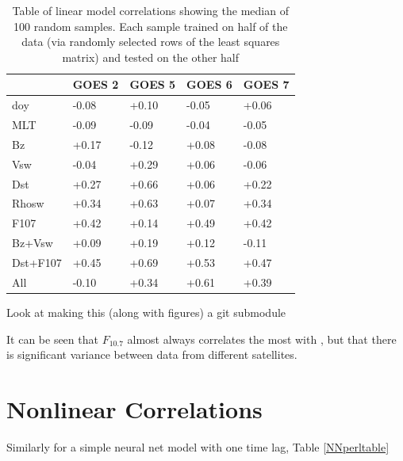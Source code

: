 \begin{table}[h]
	\small
	\begin{tabular}{|l|llll|}
		\hline
		& GOES 2 & GOES 5 & GOES 6 & GOES 7\\ \hline
		doy & -0.08 & +0.10 & -0.05 & +0.06 \\
		MLT & -0.09 & -0.09 & -0.04 & -0.05 \\
		Bz & +0.17 & -0.12 & +0.08 & -0.08 \\
		Vsw & -0.04 & +0.29 & +0.06 & -0.06 \\
		Dst & +0.27 & +0.66 & +0.06 & +0.22 \\
		Rhosw & +0.34 & +0.63 & +0.07 & +0.34 \\
		F107 & +0.42 & +0.14 & +0.49 & +0.42 \\
		Bz+Vsw & +0.09 & +0.19 & +0.12 & -0.11 \\
		Dst+F107 & +0.45 & +0.69 & +0.53 & +0.47 \\
		All & -0.10 & +0.34 & +0.61 & +0.39 \\
		\hline
	\end{tabular}
	\caption{Table of linear model correlations showing the median of 100 random samples. Each sample trained on half of the data (via randomly selected rows of the least squares matrix) and tested on the other half} 
	\label{CCperltable}
\end{table}

\vnote Look at making this (along with figures) a git submodule

It can be seen that $F_{10.7}$ almost always correlates the most with \req, but that there is significant variance between data from different satellites. 

\section{Nonlinear Correlations}

Similarly for a simple neural net model with one time lag, Table \ref{NNperltable}

